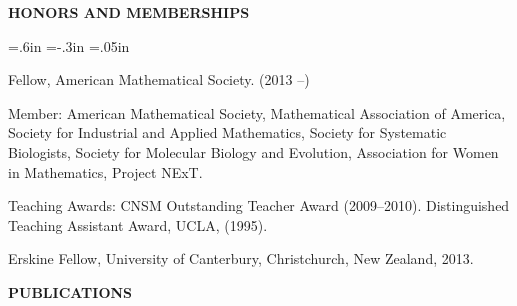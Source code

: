 \documentclass[10pt]{report}
\begin{document}
{\bf HONORS AND MEMBERSHIPS}

{ \leftskip=.6in \parindent=-.3in  \parskip=.05in

Fellow, American Mathematical Society.  (2013 --) %

Member: American Mathematical Society, Mathematical Association of
America, Society for Industrial and Applied Mathematics, 
Society for Systematic Biologists, Society for Molecular
Biology and Evolution, Association for Women in Mathematics, Project
NExT.

Teaching Awards: CNSM Outstanding Teacher Award (2009--2010).
Distinguished Teaching Assistant Award, UCLA, (1995).

Erskine Fellow, University of Canterbury, Christchurch, New Zealand, 2013.


}

{\bf PUBLICATIONS}

\medskip
 
\end{document}
